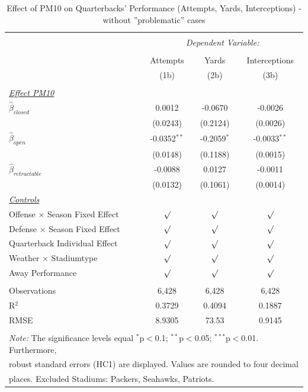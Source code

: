 \documentclass[12pt,a4paper]{article}
\begin{document}
{\begin{table}[!htbp] \centering 
  \caption{Effect of PM10 on Quarterbacks' Performance (Attempts, Yards, Interceptions) - without ''problematic'' cases} 
  \label{A:T2} 
\begin{tabular}{@{\extracolsep{5pt}}lccc} 
\hline \\[-1.8ex] 
& \multicolumn{3}{c}{\textit{Dependent Variable:}} \\ \cline{2-4} \\ [-1.8ex]
& Attempts & Yards & Interceptions \\ 
& (1b) & (2b) & (3b)\\ \hline \\[-1.8ex] 
\underline{\textit{Effect PM10}}\\[0.4cm]
$\hat{\beta}_{closed}$& 0.0012 & -0.0670 & -0.0026 \\ 
& (0.0243)  & (0.2124)& (0.0026) \\[0.4cm]
$\hat{\beta}_{open}$& -0.0352$^{**}$ & -0.2059$^{*}$ & -0.0033$^{**}$\\ 
& (0.0148) & (0.1188) & (0.0015) \\[0.4cm]
$\hat{\beta}_{retractable}$& -0.0088 & 0.0127 & -0.0011 \\ 
& (0.0132) & (0.1061) & (0.0014)\\ [0.4cm]
\underline{\textit{Controls}} \\[0.4cm]
Offense $\times$ Season Fixed Effect & $\surd$ & $\surd$ & $\surd$ \\[0.4cm]
Defense $\times$ Season Fixed Effect & $\surd$ & $\surd$  & $\surd$ \\[0.4cm]
Quarterback Individual Effect & $\surd$ & $\surd$ & $\surd$  \\[0.4cm]
Weather $\times $ Stadiumtype & $\surd$ & $\surd$ & $\surd$ \\[0.4cm]
Away Performance & $\surd$ & $\surd$ & $\surd$\\
\hline \\[-1.8ex] 
Observations & 6,428 & 6,428 & 6,428 \\ 
R$^{2}$ & 0.3729 & 0.4094 & 0.1887 \\ 
RMSE & 8.9305 & 73.53 & 0.9145 \\ \hline 
\hline \\[-1.8ex]  
\multicolumn{4}{l}{\footnotesize \textit{Note:} The significance levels equal {$^{*}$p$<$0.1; $^{**}$p$<$0.05; $^{***}$p$<$0.01}.  Furthermore,} \\ \multicolumn{4}{l}{\footnotesize robust standard errors (HC1) are displayed. Values are rounded to four decimal} \\ \multicolumn{4}{l}{\footnotesize places. Excluded Stadiums: Packers, Seahawks, Patriots.}
  \end{tabular}
\end{table} 


}
\end{document}
